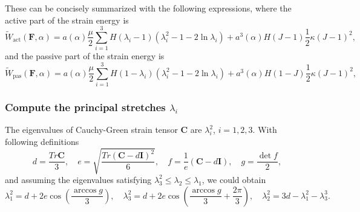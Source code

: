 \documentclass[12pt,3p]{article}
\numberwithin{equation}{section}
\begin{document}
These can be concisely summarized with the following expressions, where the active part of the strain energy is
\begin{equation}
\widetilde{W}_\text{act}\left(\mathbf{F},\alpha\right)=a(\alpha)\frac{\mu}{2}\sum_{i=1}^{3}H(\lambda_i-1)\left(\lambda_i^2-1-2\ln\lambda_i\right) + a^3(\alpha)H(J-1)\frac{1}{2}\kappa\left(J-1\right)^2,
\end{equation}
and the passive part of the strain energy is
\begin{equation}
\widetilde{W}_\text{pas}\left(\mathbf{F},\alpha\right)=a(\alpha)\frac{\mu}{2}\sum_{i=1}^{3}H(1-\lambda_i)\left(\lambda_i^2-1-2\ln\lambda_i\right) + a^3(\alpha)H(1-J)\frac{1}{2}\kappa\left(J-1\right)^2,
\end{equation}

\subsubsection{Compute the principal stretches $\lambda_i$} 
The eigenvalues of Cauchy-Green strain tensor $\mathbf{C}$ are $\lambda_i^2$, $i=1,2,3$.
With following definitions 
\begin{equation}
d=\frac{ Tr {\mathbf{C}}}{3},\quad e= \sqrt{\frac{ Tr { (\mathbf{C}-d\mathbf{I} )^2}}{6}},\quad
f=\frac{1}{e}\left(\mathbf{C}-d\mathbf{I}\right),\quad g=\frac{\det{f}}{2},
\end{equation}
and assuming the eigenvalues satisfying $\lambda_3^2\le\lambda_2\le\lambda_1$, we could obtain \citep{smith1961eigenvalues}
\begin{equation}
\lambda_1^2 = d +2e\cos\left(\frac{\arccos g}{3}\right), \quad \lambda_3^2 = d +2e\cos\left(\frac{\arccos g}{3}+\frac{2\pi}{3}\right), \quad \lambda_2^2 = 3d -\lambda_1^2 -\lambda_3^3.
\end{equation}

\newpage

\end{document}
